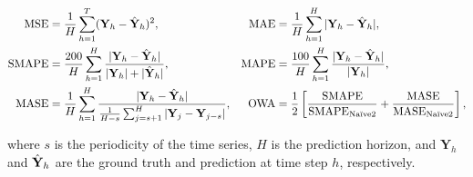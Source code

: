 \begin{align*} \label{equ:metrics}
    \text{MSE} &= \frac{1}{H}\sum_{h=1}^T (\mathbf{Y}_{h} - \Hat{\mathbf{Y}}_{h})^2,
    &
    \text{MAE} &= \frac{1}{H}\sum_{h=1}^H|\mathbf{Y}_{h} - \Hat{\mathbf{Y}}_{h}|,\\
    \text{SMAPE} &= \frac{200}{H} \sum_{h=1}^H \frac{|\mathbf{Y}_{h} - \Hat{\mathbf{Y}}_{h}|}{|\mathbf{Y}_{h}| + |\Hat{\mathbf{Y}}_{h}|},
    &
    \text{MAPE} &= \frac{100}{H} \sum_{h=1}^H \frac{|\mathbf{Y}_{h} - \Hat{\mathbf{Y}}_{h}|}{|\mathbf{Y}_{h}|}, \\
    \text{MASE} &= \frac{1}{H} \sum_{h=1}^H \frac{|\mathbf{Y}_{h} - \Hat{\mathbf{Y}}_{h}|}{\frac{1}{H-s}\sum_{j=s+1}^{H}|\mathbf{Y}_j - \mathbf{Y}_{j-s}|},
    &
    \text{OWA} &= \frac{1}{2} \left[ \frac{\text{SMAPE}}{\text{SMAPE}_{\textrm{Naïve2}}}  + \frac{\text{MASE}}{\text{MASE}_{\textrm{Naïve2}}}  \right],
\end{align*}

where $s$ is the periodicity of the time series, $H$ is the prediction horizon, and $\mathbf{Y}_{h}$ and $\Hat{\mathbf{Y}}_{h}$ are the ground truth and prediction at time step $h$, respectively.

\newpage
